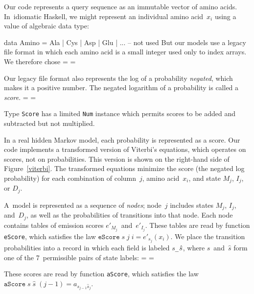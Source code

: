 \documentclass[preprint,nonatbib,blockstyle,times]{sigplanconf}
\newcommand\txprobj[3][]{a#1_{{#2}_{j-1}{#3}_j}}
\newcommand\figref[1]{Figure~\ref{#1}}
\newif\ifverbatimsmall
\newenvironment{smallverbatim}{\par\small\verbatimsmalltrue\verbatim}{\endverbatim}
\newcommand\smallverbatiminput[1]{%
  \verbatimsmalltrue
  \presvtopsep=\topsep
  \topsep=0.78\topsep
  \verbatimsmallfalse
  \topsep=\presvtopsep
}
\begin{document}
Our code represents a query sequence as an immutable vector of amino
acids.
In~idiomatic Haskell, 
we might represent an individual amino acid~$x_i$
using a value of algebraic data type:
\begin{smallverbatim}
data Amino = Ala | Cys | Asp | Glu | ...   -- not used
\end{smallverbatim}
But our models use a
legacy file format in which each amino acid is a small integer
used only to index arrays.
We therefore chose 
\smallverbatiminput{aa}


Our legacy file format also represents
the log of a probability \emph{negated}, which makes it a positive number.
The negated logarithm of a probability is called a \emph{score}.
\smallverbatiminput{score}
Type \texttt{Score} has a limited \texttt{Num} instance which permits
scores to be added and subtracted but not multiplied.

In a real hidden Markov model, each probability is represented as a score.
Our code implements a transformed version of Viterbi's equations, 
which operates on scores, not on probabilities.
This version is
shown on the right-hand side of \figref{viterbi}.
The transformed equations minimize the
score (the negated log probability) for each combination of
column~$j$, amino 
acid~$x_i$, and state $M_j$, $I_j$, or $D_j$.

A~model is represented as a sequence of \emph{nodes};
node~$j$ includes states $M_j$, $I_j$, and~$D_j$,
as well as the probabilities of transitions into that node.
Each node contains tables of emission scores
$e'_{M_j}$~and~$e'_{I_j}$.
These tables are read by function
\texttt{eScore}, which satisfies
the law %
\mbox{$\mathtt{eScore}\;s\;j\;i = e'_{s_j}(x_i)$}.
%
We place the transition probabilities 
into a record in which each field is labeled
\texttt{$s$\_$\mskip 1mu\hat s$},
where $s$~and~$\hat s$ form one of the 7~permissible pairs of state
labels: 
\smallverbatiminput{tprob-tprobs}
These scores are read by
function \texttt{aScore}, 
which satisfies
the law %
\mbox{$\mathtt{aScore}\;s\;\hat s\;(j-1) = \txprobj s {\hat s}$}.
\end{document}
